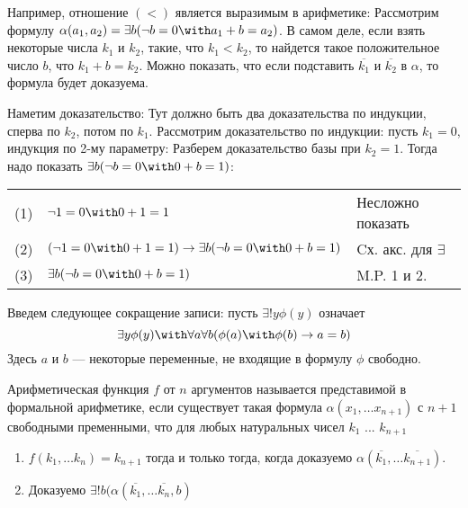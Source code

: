 Например, отношение $(<)$ является выразимым в арифметике:
Рассмотрим формулу $\alpha (a_1, a_2) = \exists b (\neg b = 0 \with a_1 + b = a_2)$.
В самом деле, если взять некоторые числа $k_1$ и $k_2$, такие, что $k_1 < k_2$, то найдется
такое положительное число $b$, что $k_1 + b = k_2$. Можно показать, что если подставить
$\overline{k_1}$ и $\overline{k_2}$ в $\alpha$, то формула будет доказуема. 

Наметим доказательство:
Тут должно быть два доказательства по индукции, сперва по $k_2$, потом по $k_1$.
Рассмотрим доказательство по индукции: пусть $k_1 = 0$, индукция по 2-му параметру:
Разберем доказательство базы при $k_2 = 1$. Тогда надо показать $\exists b (\neg b = 0 \with 0 + b = 1)$:

\begin{tabular}{lll}
(1) & $\neg 1 = 0 \with 0 + 1 = 1$ & Несложно показать\\
(2) & $(\neg 1 = 0 \with 0 + 1 = 1) \rightarrow \exists b (\neg b = 0 \with 0 + b = 1)$ & Cх. акс. для $\exists$\\
(3) & $\exists b (\neg b = 0 \with 0 + b = 1)$ & M.P. 1 и 2.
\end{tabular}

\begin{definition} Введем следующее сокращение записи:
пусть $\exists ! y \phi (y)$ означает $$\exists y \phi (y) \with \forall a \forall b (\phi(a) \with \phi(b) \rightarrow a=b)$$
Здесь $a$ и $b$ --- некоторые переменные, не входящие в формулу $\phi$ свободно.
\end{definition}

\begin{definition} Арифметическая функция $f$ от $n$ аргументов называется представимой в 
формальной арифметике, если существует такая формула $\alpha (x_1, \dots x_{n+1})$ с $n+1$ 
свободными пременными, что для любых натуральных чисел $k_1$ ... $k_{n+1}$
\begin{enumerate}
\item $f(k_1, \dots k_n) = k_{n+1}$ тогда и только тогда, когда доказуемо 
$\alpha (\overline{k_1}, \dots \overline{k_{n+1}})$.
\item Доказуемо $\exists ! b (\alpha (\overline{k_1}, \dots \overline{k_n}, b)$
\end{enumerate}
\end{definition} 


